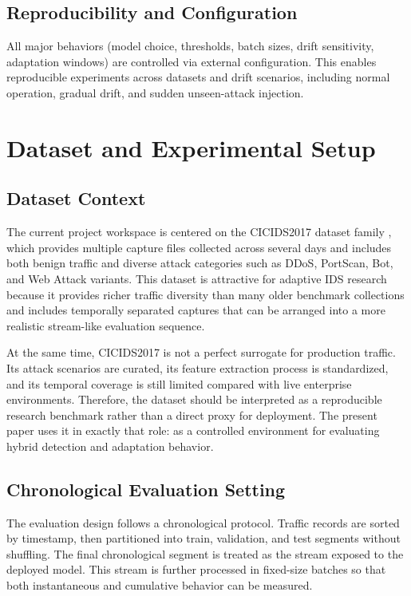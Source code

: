 \documentclass[conference]{IEEEtran}
\begin{document}
\subsection{Reproducibility and Configuration}
All major behaviors (model choice, thresholds, batch sizes, drift sensitivity, adaptation windows) are controlled via external configuration. This enables reproducible experiments across datasets and drift scenarios, including normal operation, gradual drift, and sudden unseen-attack injection.

\section{Dataset and Experimental Setup}
\subsection{Dataset Context}
The current project workspace is centered on the CICIDS2017 dataset family \cite{sharafaldin2018toward}, which provides multiple capture files collected across several days and includes both benign traffic and diverse attack categories such as DDoS, PortScan, Bot, and Web Attack variants. This dataset is attractive for adaptive IDS research because it provides richer traffic diversity than many older benchmark collections and includes temporally separated captures that can be arranged into a more realistic stream-like evaluation sequence.

At the same time, CICIDS2017 is not a perfect surrogate for production traffic. Its attack scenarios are curated, its feature extraction process is standardized, and its temporal coverage is still limited compared with live enterprise environments. Therefore, the dataset should be interpreted as a reproducible research benchmark rather than a direct proxy for deployment. The present paper uses it in exactly that role: as a controlled environment for evaluating hybrid detection and adaptation behavior.

\subsection{Chronological Evaluation Setting}
The evaluation design follows a chronological protocol. Traffic records are sorted by timestamp, then partitioned into train, validation, and test segments without shuffling. The final chronological segment is treated as the stream exposed to the deployed model. This stream is further processed in fixed-size batches so that both instantaneous and cumulative behavior can be measured.
\end{document}

